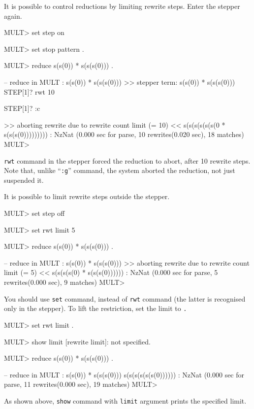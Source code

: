\documentclass[a4paper]{memoir}
\begin{document}
It is possible to control reductions by limiting rewrite steps.
Enter the stepper again.
\begin{vvtm}
\begin{ccode}
  MULT> set step on

  MULT> set stop pattern .

  MULT> reduce s(s(0)) * s(s(s(0))) .

  -- reduce in MULT : s(s(0)) * s(s(s(0)))
  >> stepper term: s(s(0)) * s(s(s(0)))
  STEP[1]? rwt 10

  STEP[1]? :c

  >> aborting rewrite due to rewrite count limit (= 10) <<
  s(s(s(s(s(s(0 * s(s(s(0))))))))) : NzNat
  (0.000 sec for parse, 10 rewrites(0.020 sec), 18 matches)
  MULT> 
\end{ccode}
\end{vvtm}
\verb|rwt| command in the stepper forced the reduction to abort,
after 10 rewrite steps. Note that, unlike ``\verb|:g|'' command,
the system aborted the reduction, not just suspended it.

It is possible to limit rewrite steps outside the stepper.
\begin{vvtm}
\begin{ccode}
  MULT> set step off

  MULT> set rwt limit 5

  MULT> reduce s(s(0)) * s(s(s(0))) .

  -- reduce in MULT : s(s(0)) * s(s(s(0)))
  >> aborting rewrite due to rewrite count limit (= 5) <<
  s(s(s(s(0) * s(s(s(0)))))) : NzNat
  (0.000 sec for parse, 5 rewrites(0.000 sec), 9 matches)
  MULT> 
\end{ccode}
\end{vvtm}
You should use \verb|set| command, instead of \verb|rwt| command
(the latter is recognised only in the stepper). To lift the
restriction, set the limit to \verb|.|
\begin{vvtm}
\begin{ccode}
  MULT> set rwt limit .         

  MULT> show limit
  [rewrite limit]: not specified.

  MULT> reduce s(s(0)) * s(s(s(0))) .

  -- reduce in MULT : s(s(0)) * s(s(s(0)))
  s(s(s(s(s(s(0)))))) : NzNat
  (0.000 sec for parse, 11 rewrites(0.000 sec), 19 matches)
  MULT> 
\end{ccode}
\end{vvtm}
As shown above, \verb|show| command with \verb|limit| argument
prints the specified limit.
\end{document}
